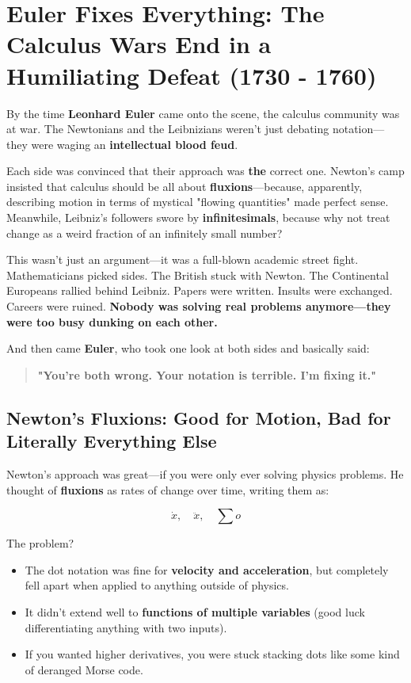 \section{Euler Fixes Everything: The Calculus Wars End in a Humiliating Defeat (1730 - 1760)}  

By the time \textbf{Leonhard Euler} came onto the scene, the calculus community was at war. The Newtonians and the Leibnizians weren’t just debating notation—they were waging an \textbf{intellectual blood feud}.  

Each side was convinced that their approach was \textbf{the} correct one. Newton’s camp insisted that calculus should be all about \textbf{fluxions}—because, apparently, describing motion in terms of mystical "flowing quantities" made perfect sense. Meanwhile, Leibniz’s followers swore by \textbf{infinitesimals}, because why not treat change as a weird fraction of an infinitely small number?  

This wasn’t just an argument—it was a full-blown academic street fight. Mathematicians picked sides. The British stuck with Newton. The Continental Europeans rallied behind Leibniz. Papers were written. Insults were exchanged. Careers were ruined. \textbf{Nobody was solving real problems anymore—they were too busy dunking on each other.}  

And then came \textbf{Euler}, who took one look at both sides and basically said:  

\begin{quote}
    \textbf{"You're both wrong. Your notation is terrible. I'm fixing it."}
\end{quote}  

\subsection{Newton’s Fluxions: Good for Motion, Bad for Literally Everything Else}  

Newton’s approach was great—if you were only ever solving physics problems. He thought of \textbf{fluxions} as rates of change over time, writing them as:

\[
\dot{x}, \quad \ddot{x}, \quad \sum o
\]

The problem?  

\begin{itemize}
    \item The dot notation was fine for \textbf{velocity and acceleration}, but completely fell apart when applied to anything outside of physics.
    \item It didn’t extend well to \textbf{functions of multiple variables} (good luck differentiating anything with two inputs).
    \item If you wanted higher derivatives, you were stuck stacking dots like some kind of deranged Morse code.  
\end{itemize}

